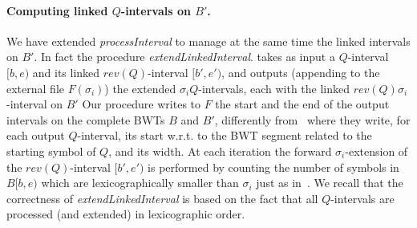 \documentclass[runningheads,envcountsame,a4paper]{llncs}
\newcommand{\notaestesa}[2]{%
 \marginpar{\color{red!75!black}\textbf{\texttimes}}%
 {\color{red!75!black}%
 [\,\textbullet\,\textsf{\textbf{#1:}} %
 \textsf{\footnotesize#2}\,\textbullet\,]}%
}
\newcommand{\wrt}{w.r.t.\xspace}
\begin{document}
\paragraph{Computing  linked $Q$-intervals on $B'$.}

We have extended \emph{processInterval} to manage at the same time  the linked intervals on
$B'$.
In fact the procedure \emph{extendLinkedInterval}.
takes as input a $Q$-interval $[b,e)$ and its linked
$rev(Q)$-interval $[b',e')$, and outputs (appending to the external file $F(\sigma_{i})$)
the extended $\sigma_i Q$-intervals, each  with the linked $rev(Q)
\sigma_i$-interval on $B'$
Our procedure writes to $F$ the start and the end of the output intervals on the
complete BWTs $B$ and $B'$, differently from~\cite{Cox2012} where they write, for each output $Q$-interval, its start \wrt to the BWT segment related to the starting symbol of $Q$, and its width.
At each iteration the forward $\sigma_i$-extension
of the $rev(Q)$-interval $[b',e')$ is performed by counting
the number of symbols in $B[b,e)$ which are lexicographically smaller than
$\sigma_i$ just as in~\cite{Simpson2010}.
We recall that the correctness of \emph{extendLinkedInterval} is based on the
fact that all $Q$-intervals are processed (and extended) in lexicographic order.








\begin{comment}
More precisely, the steps .... in algorithm \emph{extendLinkedInterval}
directly provides the values of the new $\sigma Q$-interval and such
value is appended at the end of the new updated list (or file), in order
to maintain the lexicographic ordering.
In fact, the sorted property of the file, allows to update the files
while reading the files themselves, thus minimizing the operations on the
file.
\notaestesa{PB}{nota bene il passo dal 3 al 9 non si capisce come sia
implementato in termini di memoria esterna ed interna - io sarei per
descrivere la procedura extendLinkedInterval- dettagliandola rispetto
ai linked intervals, che però vanno definiti prima, in termini
costruttivi}.


Intervals $[b,e)$ in $\mathcal{Q}_j$ represent common strings $Q$ of
length $(j+\tau)$.
Their link to the $rev(Q)$-interval $[b',e')$ on $B'$ is easily
maintained (during the backward extension of the intervals of length
$(j+\tau-1)$ to produce the intervals in $Q_j$) by Prop.~\ref{proposition:linked-intervals}.
This list is partioned into $|\Sigma|$ files according to the starting
symbol of $Q$, and maintained sorted by ascending value of the start
$b$.
\end{comment}
\end{document}
